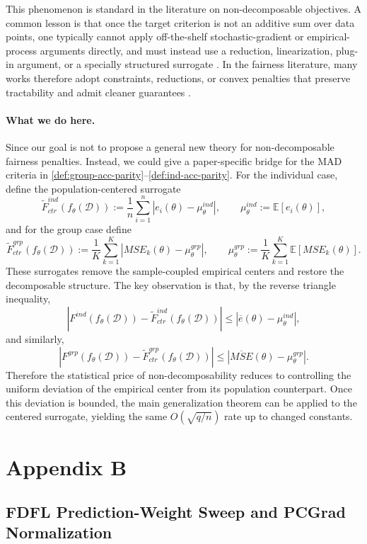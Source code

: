 \documentclass[ijoc,sglanonrev]{informs4}
\begin{document}
This phenomenon is standard in the literature on non-decomposable objectives.
A common lesson is that once the target criterion is not an additive sum over data points, one
typically cannot apply off-the-shelf stochastic-gradient or empirical-process arguments directly,
and must instead use a reduction, linearization, plug-in argument, or a specially structured surrogate
\citep{narasimhan2014consistency, narasimhan2015optimizing}.
In the fairness literature, many works therefore adopt constraints, reductions, or convex penalties
that preserve tractability and admit cleaner guarantees \citep{donini2018erm, agarwal2019fairregression}.

\paragraph{What we do here.}
Since our goal is not to propose a general new theory for non-decomposable fairness penalties.
Instead, we could give a paper-specific bridge for the MAD criteria in
\eqref{def:group-acc-parity}--\eqref{def:ind-acc-parity}.
For the individual case, define the population-centered surrogate
\[
\widetilde F^{ind}_{ctr}(f_\theta(\mathcal D))
:=
\frac{1}{n}\sum_{i=1}^n |e_i(\theta)-\mu_\theta^{ind}|,
\qquad
\mu_\theta^{ind}:=\mathbb E[e_i(\theta)],
\]
and for the group case define
\[
\widetilde F^{grp}_{ctr}(f_\theta(\mathcal D))
:=
\frac{1}{K}\sum_{k=1}^K |MSE_k(\theta)-\mu_\theta^{grp}|,
\qquad
\mu_\theta^{grp}:=\frac{1}{K}\sum_{k=1}^K \mathbb E[MSE_k(\theta)].
\]
These surrogates remove the sample-coupled empirical centers and restore the decomposable structure.
The key observation is that, by the reverse triangle inequality,
\[
\left|
F^{ind}(f_\theta(\mathcal D))
-
\widetilde F^{ind}_{ctr}(f_\theta(\mathcal D))
\right|
\le
|\overline e(\theta)-\mu_\theta^{ind}|,
\]
and similarly,
\[
\left|
F^{grp}(f_\theta(\mathcal D))
-
\widetilde F^{grp}_{ctr}(f_\theta(\mathcal D))
\right|
\le
|\overline{MSE}(\theta)-\mu_\theta^{grp}|.
\]
Therefore the statistical price of non-decomposability reduces to controlling the uniform deviation
of the empirical center from its population counterpart.
Once this deviation is bounded, the main generalization theorem can be applied to the centered
surrogate, yielding the same $O(\sqrt{q/n})$ rate up to changed constants.

\section{Appendix B}
\subsection{FDFL Prediction-Weight Sweep and PCGrad Normalization}
\label{app:mu-followup}
\end{document}
